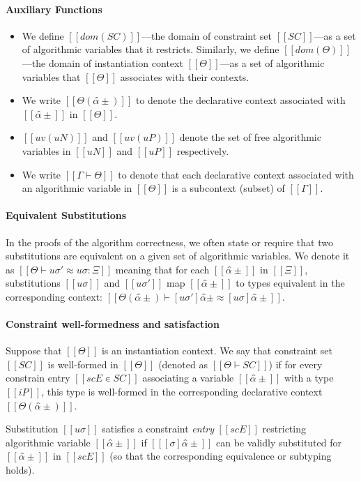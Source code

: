 \paragraph*{Auxiliary Functions}
\begin{itemize}
  \item
    We define $[[dom(SC)]]$---the domain of constraint set $[[SC]]$---as a set of
    algorithmic variables that it restricts. Similarly, we define $[[dom(Θ)]]$---the
    domain of instantiation context $[[Θ]]$---as a set of algorithmic variables that
    $[[Θ]]$ associates with their contexts.  
  \item We write $[[Θ(α̂±)]]$ to denote the
    declarative context associated with $[[α̂±]]$ in $[[Θ]]$. 
  \item $[[uv(uN)]]$ and $[[uv(uP)]]$ denote the set of free algorithmic variables in $[[uN]]$ and
    $[[uP]]$ respectively.
  \item We write $[[Γ ⊢ Θ]]$ to denote that each
    declarative context associated with an algorithmic variable in $[[Θ]]$ is 
    a subcontext (subset) of $[[Γ]]$.
\end{itemize}

\paragraph*{Equivalent Substitutions}
In the proofs of the algorithm correctness, 
we often state or require that two substitutions are equivalent
on a given set of algorithmic variables.
We denote it as $[[Θ ⊢ uσ' ≈ uσ : Ξ]]$ meaning that
for each $[[α̂±]]$ in $[[Ξ]]$, substitutions $[[uσ]]$ and $[[uσ']]$
map $[[α̂±]]$ to types equivalent in the corresponding context:
$[[ Θ(α̂±) ⊢ [uσ']α̂± ≈ [uσ]α̂± ]]$.



\paragraph*{Constraint well-formedness and satisfaction}
Suppose that $[[Θ]]$ is an instantiation context. 
We say that constraint set $[[SC]]$ is well-formed in $[[Θ]]$ 
(denoted as $[[Θ ⊢ SC]]$) 
if for every constrain entry $[[scE ∊ SC]]$
associating a variable $[[α̂±]]$ with a type $[[iP]]$,
this type is well-formed in the corresponding declarative context $[[Θ(α̂±)]]$.

Substitution $[[uσ]]$ satisfies a constraint \emph{entry} $[[scE]]$ restricting
algorithmic variable $[[α̂±]]$ if
$[[ [σ]α̂± ]]$ can be validly substituted for $[[α̂±]]$ in $[[scE]]$ 
(so that the corresponding equivalence or subtyping holds).

